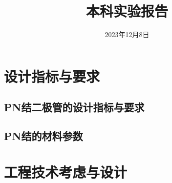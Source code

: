 \documentclass{zjureport}
\title{本科实验报告}
\date{2023年12月8日}
\begin{document}
\makecover








\section{设计指标与要求}
\subsection{PN结二极管的设计指标与要求}

\subsection{PN结的材料参数}

\section{工程技术考虑与设计}
\subsection{}


% 
\end{document}
